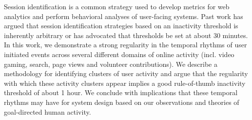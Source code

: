 Session identification is a common strategy used to develop metrics for web analytics and perform behavioral analyses of user-facing systems. Past work has argued that session identification strategies based on an inactivity threshold is inherently arbitrary or has advocated that thresholds be set at about 30 minutes. In this work, we demonstrate a strong regularity in the temporal rhythms of user initiated events across several different domains of online activity (incl. video gaming, search, page views and volunteer contributions). We describe a methodology for identifying clusters of user activity and argue that the regularity with which these activity clusters appear implies a good rule-of-thumb inactivity threshold of about 1 hour.  We conclude with implications that these temporal rhythms may have for system design based on our observations and theories of goal-directed human activity.
